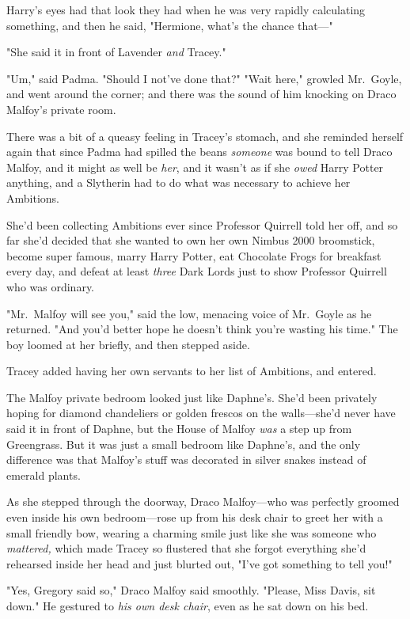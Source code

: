 Harry's eyes had that look they had when he was very rapidly calculating 
something, and then he said, "Hermione, what's the chance that---"

"She said it in front of Lavender \emph{and} Tracey."

"Um," said Padma. "Should I not've done that?"
\sbreak
"Wait here," growled Mr.~Goyle, and went around the corner; and there was the 
sound of him knocking on Draco Malfoy's private room.

There was a bit of a queasy feeling in Tracey's stomach, and she reminded 
herself again that since Padma had spilled the beans \emph{someone} was bound 
to tell Draco Malfoy, and it might as well be \emph{her}, and it wasn't as if 
she \emph{owed} Harry Potter anything, and a Slytherin had to do what was 
necessary to achieve her Ambitions.

She'd been collecting Ambitions ever since Professor Quirrell told her off, and 
so far she'd decided that she wanted to own her own Nimbus 2000 broomstick, 
become super famous, marry Harry Potter, eat Chocolate Frogs for breakfast 
every day, and defeat at least \emph{three} Dark Lords just to show Professor 
Quirrell who was ordinary.

"Mr.~Malfoy will see you," said the low, menacing voice of Mr.~Goyle as he 
returned. "And you'd better hope he doesn't think you're wasting his time." The 
boy loomed at her briefly, and then stepped aside.

Tracey added having her own servants to her list of Ambitions, and entered.

The Malfoy private bedroom looked just like Daphne's. She'd been privately 
hoping for diamond chandeliers or golden frescos on the walls---she'd never 
have said it in front of Daphne, but the House of Malfoy \emph{was} a step up 
from Greengrass. But it was just a small bedroom like Daphne's, and the only 
difference was that Malfoy's stuff was decorated in silver snakes instead of 
emerald plants.

As she stepped through the doorway, Draco Malfoy---who was perfectly groomed 
even inside his own bedroom---rose up from his desk chair to greet her with a 
small friendly bow, wearing a charming smile just like she was someone who 
\emph{mattered,} which made Tracey so flustered that she forgot everything 
she'd rehearsed inside her head and just blurted out, "I've got something to 
tell you!"

"Yes, Gregory said so," Draco Malfoy said smoothly. "Please, Miss Davis, sit 
down." He gestured to \emph{his own desk chair}, even as he sat down on his bed.

